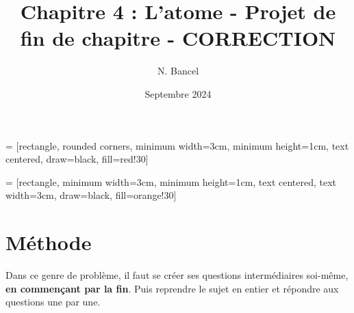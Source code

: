 \documentclass[a4paper,12pt]{article}
\begin{document}
\title{Chapitre 4 : L'atome - Projet de fin de chapitre - CORRECTION}
\author{N. Bancel}
\date{Septembre 2024}
\maketitle

 = [rectangle, rounded corners, 
minimum width=3cm, 
minimum height=1cm,
text centered, 
draw=black, 
fill=red!30]

 = [rectangle, 
minimum width=3cm, 
minimum height=1cm, 
text centered, 
text width=3cm, 
draw=black, 
fill=orange!30]


\section*{Méthode}

Dans ce genre de problème, il faut se créer ses questions intermédiaires soi-même, \textbf{en commençant par la fin}. Puis reprendre le sujet en entier et répondre aux questions une par une.



\end{document}

